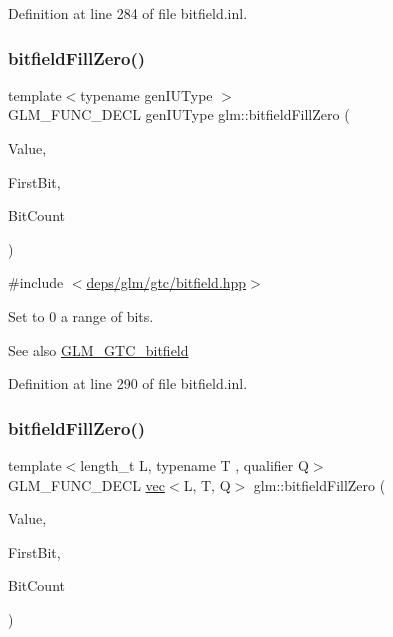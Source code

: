 Definition at line 284 of file bitfield.\+inl.

\mbox{\label{group__gtc__bitfield_ga697b86998b7d74ee0a69d8e9f8819fee}} 
\subsubsection{\texorpdfstring{bitfield\+Fill\+Zero()}{bitfieldFillZero()}\hspace{0.1cm}{\footnotesize\ttfamily [1/2]}}
{\footnotesize\ttfamily template$<$typename gen\+I\+U\+Type $>$ \\
G\+L\+M\+\_\+\+F\+U\+N\+C\+\_\+\+D\+E\+CL gen\+I\+U\+Type glm\+::bitfield\+Fill\+Zero (\begin{DoxyParamCaption}\item[{gen\+I\+U\+Type}]{Value,  }\item[{int}]{First\+Bit,  }\item[{int}]{Bit\+Count }\end{DoxyParamCaption})}



{\ttfamily \#include $<$\hyperlink{bitfield_8hpp}{deps/glm/gtc/bitfield.\+hpp}$>$}

Set to 0 a range of bits.

\begin{DoxySeeAlso}{See also}
\hyperlink{group__gtc__bitfield}{G\+L\+M\+\_\+\+G\+T\+C\+\_\+bitfield} 
\end{DoxySeeAlso}


Definition at line 290 of file bitfield.\+inl.

\mbox{\label{group__gtc__bitfield_ga0d16c9acef4be79ea9b47c082a0cf7c2}} 
\subsubsection{\texorpdfstring{bitfield\+Fill\+Zero()}{bitfieldFillZero()}\hspace{0.1cm}{\footnotesize\ttfamily [2/2]}}
{\footnotesize\ttfamily template$<$length\+\_\+t L, typename T , qualifier Q$>$ \\
G\+L\+M\+\_\+\+F\+U\+N\+C\+\_\+\+D\+E\+CL \hyperlink{structglm_1_1vec}{vec}$<$L, T, Q$>$ glm\+::bitfield\+Fill\+Zero (\begin{DoxyParamCaption}\item[{\hyperlink{structglm_1_1vec}{vec}$<$ L, T, Q $>$ const \&}]{Value,  }\item[{int}]{First\+Bit,  }\item[{int}]{Bit\+Count }\end{DoxyParamCaption})}



